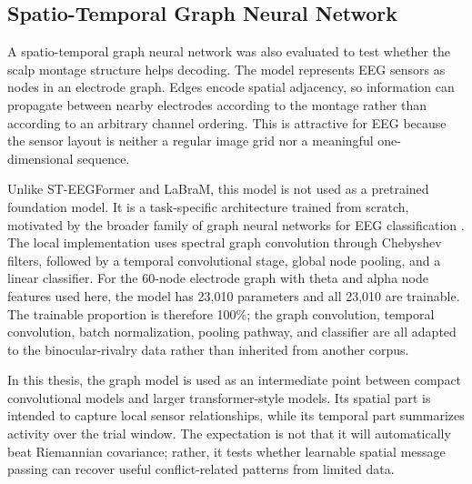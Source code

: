 \documentclass[11pt,a4paper,chapterprefix=false,parskip=false]{scrreprt}
\begin{document}
\subsection{Spatio-Temporal Graph Neural Network}
A spatio-temporal graph neural network was also evaluated to test whether the scalp montage structure helps decoding. The model represents EEG sensors as nodes in an electrode graph. Edges encode spatial adjacency, so information can propagate between nearby electrodes according to the montage rather than according to an arbitrary channel ordering. This is attractive for EEG because the sensor layout is neither a regular image grid nor a meaningful one-dimensional sequence.

Unlike ST-EEGFormer and LaBraM, this model is not used as a pretrained foundation model. It is a task-specific architecture trained from scratch, motivated by the broader family of graph neural networks for EEG classification \citep{klepl_graph_2024}. The local implementation uses spectral graph convolution through Chebyshev filters, followed by a temporal convolutional stage, global node pooling, and a linear classifier. For the 60-node electrode graph with theta and alpha node features used here, the model has 23,010 parameters and all 23,010 are trainable. The trainable proportion is therefore 100\%; the graph convolution, temporal convolution, batch normalization, pooling pathway, and classifier are all adapted to the binocular-rivalry data rather than inherited from another corpus.

In this thesis, the graph model is used as an intermediate point between compact convolutional models and larger transformer-style models. Its spatial part is intended to capture local sensor relationships, while its temporal part summarizes activity over the trial window. The expectation is not that it will automatically beat Riemannian covariance; rather, it tests whether learnable spatial message passing can recover useful conflict-related patterns from limited data.
\end{document}
